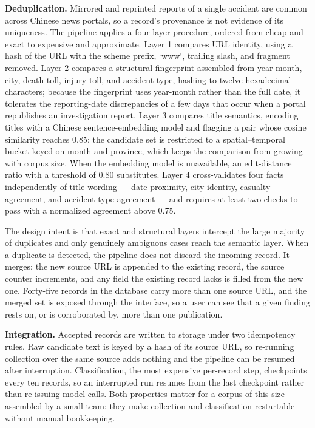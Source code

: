 \documentclass[11pt]{article}
\begin{document}
\textbf{Deduplication.} Mirrored and reprinted reports of a single accident are common across Chinese news portals, so a record's provenance is not evidence of its uniqueness. The pipeline applies a four-layer procedure, ordered from cheap and exact to expensive and approximate. Layer 1 compares URL identity, using a hash of the URL with the scheme prefix, `www`, trailing slash, and fragment removed. Layer 2 compares a structural fingerprint assembled from year-month, city, death toll, injury toll, and accident type, hashing to twelve hexadecimal characters; because the fingerprint uses year-month rather than the full date, it tolerates the reporting-date discrepancies of a few days that occur when a portal republishes an investigation report. Layer 3 compares title semantics, encoding titles with a Chinese sentence-embedding model and flagging a pair whose cosine similarity reaches 0.85; the candidate set is restricted to a spatial--temporal bucket keyed on month and province, which keeps the comparison from growing with corpus size. When the embedding model is unavailable, an edit-distance ratio with a threshold of 0.80 substitutes. Layer 4 cross-validates four facts independently of title wording --- date proximity, city identity, casualty agreement, and accident-type agreement --- and requires at least two checks to pass with a normalized agreement above 0.75.

The design intent is that exact and structural layers intercept the large majority of duplicates and only genuinely ambiguous cases reach the semantic layer. When a duplicate is detected, the pipeline does not discard the incoming record. It merges: the new source URL is appended to the existing record, the source counter increments, and any field the existing record lacks is filled from the new one. Forty-five records in the database carry more than one source URL, and the merged set is exposed through the interface, so a user can see that a given finding rests on, or is corroborated by, more than one publication.

\textbf{Integration.} Accepted records are written to storage under two idempotency rules. Raw candidate text is keyed by a hash of its source URL, so re-running collection over the same source adds nothing and the pipeline can be resumed after interruption. Classification, the most expensive per-record step, checkpoints every ten records, so an interrupted run resumes from the last checkpoint rather than re-issuing model calls. Both properties matter for a corpus of this size assembled by a small team: they make collection and classification restartable without manual bookkeeping.
\end{document}
